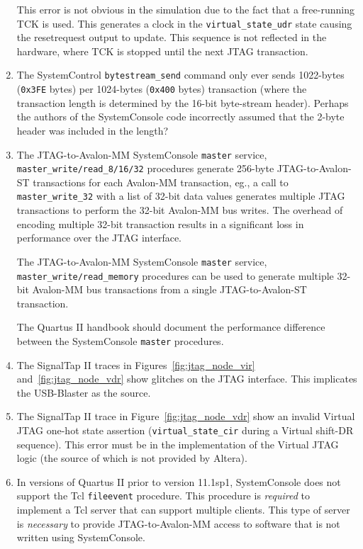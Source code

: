 \documentclass[10pt,twoside]{article}
\begin{document}
\begin{enumerate}
This error is not obvious in the simulation due to the fact that
a free-running TCK is used. This generates a clock in the 
\verb+virtual_state_udr+ state  causing the resetrequest output
to update. This sequence is not reflected in the hardware, where
TCK is stopped until the next JTAG transaction.

\item The SystemControl \verb+bytestream_send+ command only ever
sends 1022-bytes (\verb+0x3FE+ bytes) per 1024-bytes (\verb+0x400+ bytes)
transaction (where the transaction length is determined by the
16-bit byte-stream header). Perhaps the authors of the SystemConsole
code incorrectly assumed that the 2-byte header was included in
the length?

\item The JTAG-to-Avalon-MM SystemConsole \verb+master+ service,
\verb+master_write/read_8/16/32+ procedures generate
256-byte JTAG-to-Avalon-ST transactions for each Avalon-MM
transaction, eg., a call to \verb+master_write_32+ with a list
of 32-bit data values generates multiple JTAG transactions to
perform the 32-bit Avalon-MM bus writes.
The overhead of encoding multiple 32-bit transaction results in
a significant loss in performance over the JTAG interface.

The JTAG-to-Avalon-MM SystemConsole \verb+master+ service,
\verb+master_write/read_memory+ procedures can be used to generate
multiple 32-bit Avalon-MM bus transactions from a single
JTAG-to-Avalon-ST transaction. 

The Quartus II handbook should document the performance
difference between the SystemConsole \verb+master+ procedures.

\item The SignalTap II traces in Figures~\ref{fig:jtag_node_vir}
and~\ref{fig:jtag_node_vdr} show glitches on the JTAG interface.
This implicates the USB-Blaster as the source.

\item The SignalTap II trace in Figure~\ref{fig:jtag_node_vdr}
show an invalid Virtual JTAG one-hot state assertion
(\verb+virtual_state_cir+ during a Virtual shift-DR sequence).
This error must be in the implementation of the Virtual JTAG
logic (the source of which is not provided by Altera).

\item In versions of Quartus II prior to version 11.1sp1,
SystemConsole does not support the Tcl \verb+fileevent+ 
procedure. This procedure is {\em required} to implement a
Tcl server that can support multiple clients. This type
of server is {\em necessary} to provide JTAG-to-Avalon-MM
access to software that is not written using SystemConsole.

\end{enumerate}


\clearpage
%



\end{document}
